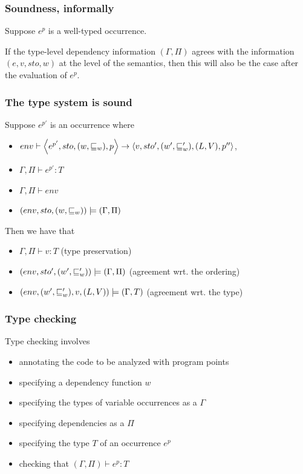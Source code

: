 \documentclass[aspectratio=169]{beamer}
\begin{document}
\begin{frame}
  \frametitle{Soundness, informally}

Suppose $e^p$ is a well-typed occurrence.
  
If the type-level dependency information $(\Gamma,\Pi)$ agrees with
the information $(e,v,sto,w)$ at the level of the semantics, then this
will also be the case after the evaluation of $e^p$.
 
\end{frame}

\begin{frame}
  \frametitle{The type system is sound}

  \begin{theorem}[Soundness]
	Suppose $e^{p'}$ is an occurrence where
	\begin{itemize}
		\item $env\vdash\left\langle e^{p'},sto,(w,\sqsubseteq_w),p\right\rangle\rightarrow\left\langle v,sto',(w',\sqsubseteq_w'),(L,V),p''\right\rangle$,
		\item $\Gamma,\Pi\vdash e^{p'} : T$
		\item $\Gamma,\Pi\vdash env$
		\item $(env,sto,(w,\sqsubseteq_w))\models(\Gamma,\Pi)$
	\end{itemize}
	Then we have that
	\begin{itemize}
		\item $\Gamma,\Pi\vdash v:T$   \alert{(type preservation)}
		\item $(env,sto',(w',\sqsubseteq_w'))\models(\Gamma,\Pi)$
                  \alert{(agreement wrt. the ordering)}
                  
		\item $(env,(w',\sqsubseteq_w'),v,(L,V))\models(\Gamma,T)$  \alert{(agreement wrt. the type)}
	\end{itemize}
      \end{theorem}
      
\end{frame}

\begin{frame}
  \frametitle{Type checking}

  Type checking involves
  
  \begin{itemize}
  \item annotating the code to be analyzed with program points
  \item specifying a dependency function $w$
  \item specifying the types of variable occurrences as a $\Gamma$
 \item specifying dependencies as a $\Pi$
  \item specifying the type $T$ of an occurrence $e^p$
  \item checking that $(\Gamma,\Pi) \vdash e^p : T$
  \end{itemize}

\end{frame}
\end{document}
